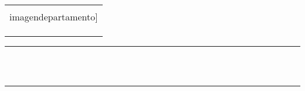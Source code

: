 {{{{{{{	\begin{center}
		\vspace*{-1.0cm}
		\begin{tabular}{c}
			\texttt{[image: \\imagendepartamento]} \vspace{0.5cm} \\
			\small \scshape{\MakeUppercase{\nombreuniversidad}} \\
			\small \scshape{\MakeUppercase{\nombrefacultad}} \\
			\small \scshape{\MakeUppercase{\departamentouniversidad}}
		\end{tabular}
	\end{center}
	
	\vfill
	\begin{center}
		\noindent \rule{\textwidth}{0.4mm} \\ \vspace{0.3cm}
		{\huge \textcolor{\portraittitlecolor}{\titulodelinforme} \vspace{0.2cm} \\}
		\noindent \rule{\textwidth}{0.4mm} \\ \vspace{0.40cm}
		{\large \textcolor{\portraittitlecolor}{\temaatratar} \\}
	\end{center}
	
	\vfill
	\noindent
	\begin{minipage}{1.0\textwidth}
		\begin{flushright}
			\scshape{\tablaintegrantes}
		\end{flushright}
	\end{minipage}
}{
}}}}}}}
